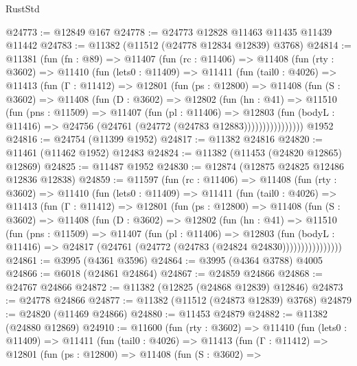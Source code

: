 \begin{lexlean}{RustStd}
\begin{coremodule}
@24773 := @12849 @167
@24778 := @24773 @12828 @11463 @11435 @11439 @11442
@24783 := @11382 (@11512 (@24778 @12834 @12839) @3768)
@24814 := @11381
    (fun (fn : @89) =>
    @11407
      (fun (rc : @11406) =>
      @11408
        (fun (rty : @3602) =>
        @11410
          (fun (lets0 : @11409) =>
          @11411
            (fun (tail0 : @4026) =>
            @11413
              (fun (Γ : @11412) =>
              @12801
                (fun (ps : @12800) =>
                @11408
                  (fun (S : @3602) =>
                  @11408
                    (fun (D : @3602) =>
                    @12802
                      (fun (hn : @41) =>
                      @11510
                        (fun (pns : @11509) =>
                        @11407
                          (fun (pl : @11406) =>
                          @12803
                            (fun (bodyL : @11416) =>
                            @24756 (@24761 (@24772 (@24783 @12883))))))))))))))))
    @1952
@24816 := @24754 (@11399 @1952)
@24817 := @11382 @24816
@24820 := @11461 (@11462 @1952) @12483
@24824 := @11382 (@11453 (@24820 @12865) @12869)
@24825 := @11487 @1952
@24830 := @12874 (@12875 @24825 @12486 @12836 @12838)
@24859 := @11597
    (fun (rc : @11406) =>
    @11408
      (fun (rty : @3602) =>
      @11410
        (fun (lets0 : @11409) =>
        @11411
          (fun (tail0 : @4026) =>
          @11413
            (fun (Γ : @11412) =>
            @12801
              (fun (ps : @12800) =>
              @11408
                (fun (S : @3602) =>
                @11408
                  (fun (D : @3602) =>
                  @12802
                    (fun (hn : @41) =>
                    @11510
                      (fun (pns : @11509) =>
                      @11407
                        (fun (pl : @11406) =>
                        @12803
                          (fun (bodyL : @11416) =>
                          @24817 (@24761 (@24772 (@24783 (@24824 @24830))))))))))))))))
@24861 := @3995 (@4361 @3596)
@24864 := @3995 (@4364 @3788) @4005
@24866 := @6018 (@24861 @24864)
@24867 := @24859 @24866
@24868 := @24767 @24866
@24872 := @11382 (@12825 (@24868 @12839) @12846)
@24873 := @24778 @24866
@24877 := @11382 (@11512 (@24873 @12839) @3768)
@24879 := @24820 (@11469 @24866)
@24880 := @11453 @24879
@24882 := @11382 (@24880 @12869)
@24910 := @11600
    (fun (rty : @3602) =>
    @11410
      (fun (lets0 : @11409) =>
      @11411
        (fun (tail0 : @4026) =>
        @11413
          (fun (Γ : @11412) =>
          @12801
            (fun (ps : @12800) =>
            @11408
              (fun (S : @3602) =>

\end{coremodule}
\end{lexlean}

